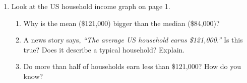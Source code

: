 \documentclass[11pt]{article}
\newif\ifkey
\newcommand{\ans}[1]{\ifkey\leavevmode{\color{red!75!black}#1}\fi}
\begin{document}
\begin{enumerate}[leftmargin=1.5em,itemsep=1em]
\begin{enumerate}[itemsep=\ifkey 2.2em\else 3.5em\fi]
  \ans{Symmetric. Most heights are near the middle, with about as many tall as short.}
\end{enumerate}
\vspace{\ifkey 2.2em\else 3.5em\fi}

\item Look at the US household income graph on page 1.
\begin{enumerate}[itemsep=\ifkey 2.2em\else 3.5em\fi]
  \item Why is the mean (\$121,000) bigger than the median (\$84,000)?

  \ans{Income is skewed right. A small number of very high incomes pull the mean toward the tail.}
  \item A news story says, \textit{``The average US household earns \$121,000.''}
  Is this true? Does it describe a typical household? Explain.

  \ans{It is true for the mean. It does not describe a typical household. Most households earn less. The median is a better description of a typical household.}
  \item Do more than half of households earn less than \$121,000? How do you know?

  \ans{Yes. Half of households earn less than \$84,000 (the median). Some more earn between \$84,000 and \$121,000.}
\end{enumerate}

\end{enumerate}
\end{document}
